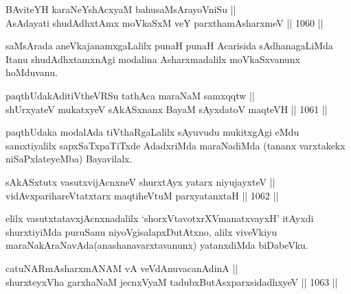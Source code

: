 
\begin{shl}
BAviteYH karaNeYshAcxyaM bahusaMsArayoVniSu || \\
AsAdayati shudAdhxtAmx moVkaSxM veY parxthamAsharxmeV \hfill || 1060 ||  
\end{shl}

\begin{artha}
saMsArada aneVkajanamxgaLalilx punaH punaH Acarisida sAdhanagaLiMda Itanu shudAdhxtamxnAgi modalina Asharxmadalilx moVkaSxvanunx hoMduvanu.
\end{artha}


\begin{shl}
paqthUdakAditiVtheVRSu tathAca maraNaM samxqqtw || \\
shUrxyateV mukatxyeV sAkASxnanx BayaM sAyxdatoV maqteVH \hfill || 1061 ||  
\end{shl}

\begin{artha}
paqthUdaka modalAda tiVthaRgaLalilx sAyuvudu mukitxgAgi eMdu samxtiyalilx sapxSaTxpaTiTxde AdadxriMda maraNadiMda (tananx varxtakekx niSaPxlateyeMba) Bayavilalx.
\end{artha}

\begin{shl}
sAkASxtutx vasutxvijAcnxneV shurxtAyx yatarx niyujayxteV || \\
vidAvxparihareVtatxtarx maqtiheVtuM parxyatanxtaH \hfill || 1062 ||  
\end{shl}

\begin{artha}
elilx vasutxtatavxjAcnxnadalilx `shorxVtavotxrXVmanatxvayxH' itAyxdi shurxtiyiMda puruSanu niyoVgisalapxDutAtxno, alilx viveVkiyu maraNakAraNavAda(anashanavarxtavanunx) yatanxdiMda biDabeVku.
\end{artha}


\begin{shl}
\footnotemark[1]catuNARmAsharxmANAM vA veVdAnuvacanAdinA || \\
shurxteyxVha garxhaNaM jecnxVyaM tadubxButAsxparxsidadhxyeV \hfill || 1063 ||  
\end{shl}

